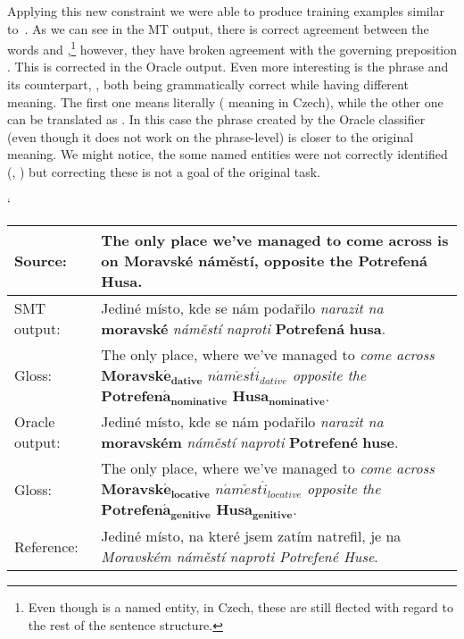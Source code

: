 Applying this new constraint we were able to produce training examples similar to~.
As we can see in the MT output, there is correct agreement between the words  and ,\footnote{
Even though  is a named entity, in Czech, these are still flected with regard to the rest of the sentence
structure.} however, they have broken agreement with the governing preposition . This is corrected in the Oracle output.
Even more interesting is the phrase  and its counterpart, ,
both being grammatically correct while having different meaning. The first one means literally 
( meaning  in Czech), while the other one can be translated as .
In this case the phrase created by the Oracle classifier (even though it does not work on the phrase-level) is closer
to the original meaning. We might notice, the some named entities were not correctly identified (, ) but
correcting these is not a goal of the original task.

\begin{myexample}
    \small
    \catcode`
    \begin{center}
    \begin{tabular}{|l|p{}|}
    \hline
    \textbf{Source:}  &  \textbf{The only place we've managed to come across is on Moravské náměstí, opposite the Potrefená Husa.}  \\
    \hline
    SMT output:  &  Jediné místo, kde se nám podařilo \textit{narazit na} \textbf{moravské} \textit{náměstí} \textit{naproti} \textbf{Potrefená} \textbf{husa}.  \\
    \hline
    Gloss:  &  The only place, where we've managed to \textit{come across} $\mathbf{Moravsk\acute{e}_{dative}}$ $\mathit{n\acute{a}m\check{e}st\acute{i}_{dative}}$ \textit{opposite the} $\mathbf{Potrefen\acute{a}_{nominative}}$ $\mathbf{Husa_{nominative}}$. \\
    \hline
    Oracle output:  &  Jediné místo, kde se nám podařilo \textit{narazit na} \textbf{moravském} \textit{náměstí} \textit{naproti} \textbf{Potrefené} \textbf{huse}.  \\
    \hline
    Gloss:  &  The only place, where we've managed to \textit{come across} $\mathbf{Moravsk\acute{e}_{locative}}$ $\mathit{n\acute{a}m\check{e}st\acute{i}_{locative}}$ \textit{opposite the} $\mathbf{Potrefen\acute{a}_{genitive}}$ $\mathbf{Husa_{genitive}}$.  \\
    \hline
    Reference:  &  Jediné místo, na které jsem zatím natrefil, je na \textit{Moravském náměstí naproti Potrefené Huse}.  \\
    \hline
    \end{tabular}
    \label{ex-oracle-parentmark}
    \end{center}
\end{myexample}

